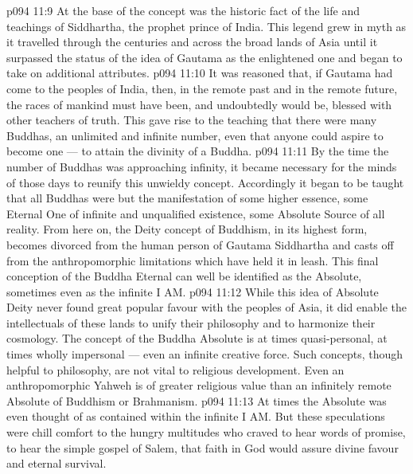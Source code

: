 \vs p094 11:9 \bibnobreakspace {} At the base of the concept was the historic fact of the life and teachings of Siddhartha, the prophet prince of India. This legend grew in myth as it travelled through the centuries and across the broad lands of Asia until it surpassed the status of the idea of Gautama as the enlightened one and began to take on additional attributes.
\vs p094 11:10 \bibnobreakspace {} It was reasoned that, if Gautama had come to the peoples of India, then, in the remote past and in the remote future, the races of mankind must have been, and undoubtedly would be, blessed with other teachers of truth. This gave rise to the teaching that there were many Buddhas, an unlimited and infinite number, even that anyone could aspire to become one --- to attain the divinity of a Buddha.
\vs p094 11:11 \bibnobreakspace {} By the time the number of Buddhas was approaching infinity, it became necessary for the minds of those days to reunify this unwieldy concept. Accordingly it began to be taught that all Buddhas were but the manifestation of some higher essence, some Eternal One of infinite and unqualified existence, some Absolute Source of all reality. From here on, the Deity concept of Buddhism, in its highest form, becomes divorced from the human person of Gautama Siddhartha and casts off from the anthropomorphic limitations which have held it in leash. This final conception of the Buddha Eternal can well be identified as the Absolute, sometimes even as the infinite I AM.
\vs p094 11:12 \pc While this idea of Absolute Deity never found great popular favour with the peoples of Asia, it did enable the intellectuals of these lands to unify their philosophy and to harmonize their cosmology. The concept of the Buddha Absolute is at times quasi\hyp{}personal, at times wholly impersonal --- even an infinite creative force. Such concepts, though helpful to philosophy, are not vital to religious development. Even an anthropomorphic Yahweh is of greater religious value than an infinitely remote Absolute of Buddhism or Brahmanism.
\vs p094 11:13 At times the Absolute was even thought of as contained within the infinite I AM. But these speculations were chill comfort to the hungry multitudes who craved to hear words of promise, to hear the simple gospel of Salem, that faith in God would assure divine favour and eternal survival.
